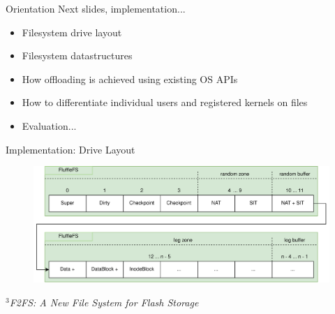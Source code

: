 \documentclass{beamer}
\begin{document}
\begin{frame}{Orientation}
	\begingroup
	\small Next slides, implementation...
	\begin{itemize}
		\item Filesystem drive layout
		\item Filesystem datastructures
		\item How offloading is achieved using existing OS APIs
		\item How to differentiate individual users and registered kernels on files
		\item Evaluation...
	\end{itemize}
	\endgroup
\end{frame}

\begin{frame}{Implementation: Drive Layout}
	\begingroup
	\small
	\begin{figure}[h]
		\centering
		\includegraphics[width=1.0\linewidth]{resources/images/fluffle-layout-complete.png}
	\end{figure}
	\textit{\tiny $^{3}$F2FS: A New File System for Flash Storage}
	\endgroup
\end{frame}
\end{document}
